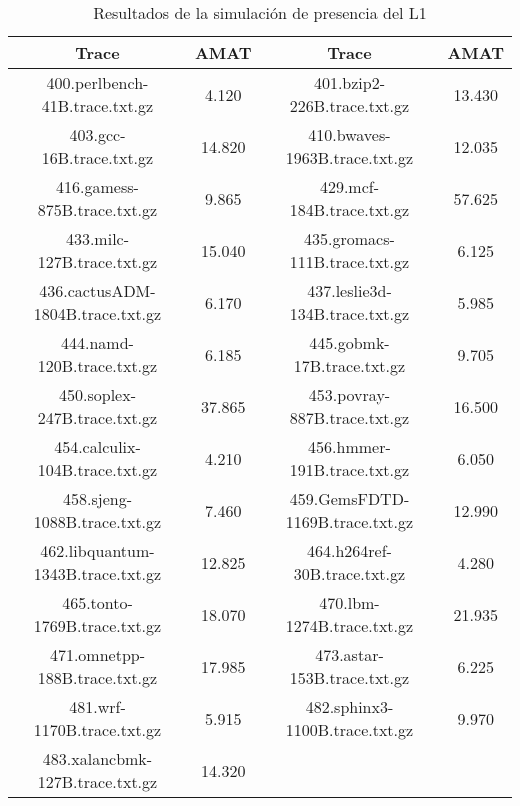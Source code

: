 \begin{table}[H]
\centering
\begin{tabular}{|c|c|c|c|}
\hline
Trace  & AMAT  & Trace  & AMAT  \\
\hline
400.perlbench-41B.trace.txt.gz & 4.120 & 401.bzip2-226B.trace.txt.gz & 13.430 \\\hline
403.gcc-16B.trace.txt.gz & 14.820 & 410.bwaves-1963B.trace.txt.gz & 12.035 \\\hline
416.gamess-875B.trace.txt.gz & 9.865 & 429.mcf-184B.trace.txt.gz & 57.625 \\\hline
433.milc-127B.trace.txt.gz & 15.040 & 435.gromacs-111B.trace.txt.gz & 6.125 \\\hline
436.cactusADM-1804B.trace.txt.gz & 6.170 & 437.leslie3d-134B.trace.txt.gz & 5.985 \\\hline
444.namd-120B.trace.txt.gz & 6.185 & 445.gobmk-17B.trace.txt.gz & 9.705 \\\hline
450.soplex-247B.trace.txt.gz & 37.865 & 453.povray-887B.trace.txt.gz & 16.500 \\\hline
454.calculix-104B.trace.txt.gz & 4.210 & 456.hmmer-191B.trace.txt.gz & 6.050 \\\hline
458.sjeng-1088B.trace.txt.gz & 7.460 & 459.GemsFDTD-1169B.trace.txt.gz & 12.990 \\\hline
462.libquantum-1343B.trace.txt.gz & 12.825 & 464.h264ref-30B.trace.txt.gz & 4.280 \\\hline
465.tonto-1769B.trace.txt.gz & 18.070 & 470.lbm-1274B.trace.txt.gz & 21.935 \\\hline
471.omnetpp-188B.trace.txt.gz & 17.985 & 473.astar-153B.trace.txt.gz & 6.225 \\\hline
481.wrf-1170B.trace.txt.gz & 5.915 & 482.sphinx3-1100B.trace.txt.gz & 9.970 \\\hline
483.xalancbmk-127B.trace.txt.gz & 14.320 &  &  \\\hline
\end{tabular}
\caption{Resultados de la simulación de presencia del L1}
\label{tab:amatL1}
\end{table}